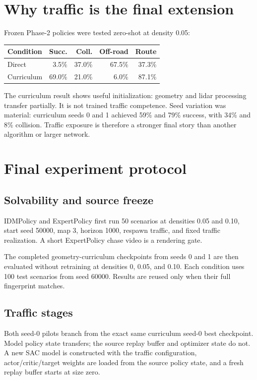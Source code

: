 \documentclass[10pt,twocolumn]{article}
\begin{document}
\section{Why traffic is the final extension}
Frozen Phase-2 policies were tested zero-shot at density 0.05:
\begin{center}
\begin{tabular}{lrrrr}
\toprule
Condition & Succ. & Coll. & Off-road & Route \\
\midrule
Direct & 3.5\% & 37.0\% & 67.5\% & 37.3\% \\
Curriculum & 69.0\% & 21.0\% & 6.0\% & 87.1\% \\
\bottomrule
\end{tabular}
\end{center}
The curriculum result shows useful initialization: geometry and lidar processing transfer
partially. It is not trained traffic competence. Seed variation was material: curriculum
seeds 0 and 1 achieved 59\% and 79\% success, with 34\% and 8\% collision. Traffic
exposure is therefore a stronger final story than another algorithm or larger network.

\section{Final experiment protocol}
\subsection{Solvability and source freeze}
IDMPolicy and ExpertPolicy first run 50 scenarios at densities 0.05 and 0.10, start seed
50000, map 3, horizon 1000, respawn traffic, and fixed traffic realization. A short
ExpertPolicy chase video is a rendering gate.

The completed geometry-curriculum checkpoints from seeds 0 and 1 are then evaluated
without retraining at densities 0, 0.05, and 0.10. Each condition uses 100 test scenarios
from seed 60000. Results are reused only when their full fingerprint matches.

\subsection{Traffic stages}
Both seed-0 pilots branch from the exact same curriculum seed-0 best checkpoint. Model
policy state transfers; the source replay buffer and optimizer state do not. A new SAC
model is constructed with the traffic configuration, actor/critic/target weights are
loaded from the source policy state, and a fresh replay buffer starts at size zero.
\end{document}
